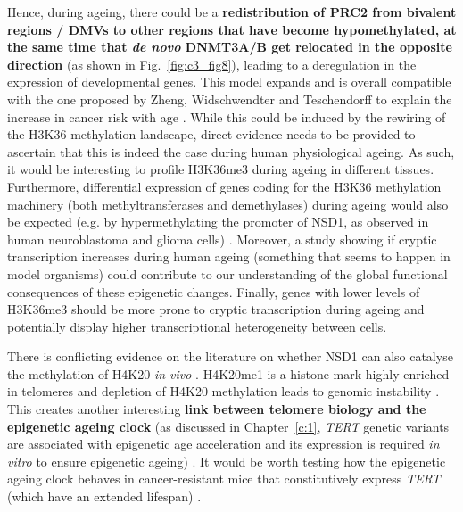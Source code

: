 Hence, during ageing, there could be a  \textbf{redistribution of \acrshort{PRC2} from bivalent regions / \acrshort{DMV}s to other regions that have become hypomethylated, at the same time that \textit{de novo} DNMT3A/B get relocated in the opposite direction} (as shown in Fig.~\ref{fig:c3_fig8}), leading to a deregulation in the expression of developmental genes. This model expands and is overall compatible with the one proposed by Zheng, Widschwendter and Teschendorff to explain the increase in cancer risk with age \cite{Zheng2016}. While this could be induced by the rewiring of the H3K36 methylation landscape, direct evidence needs to be provided to ascertain that this is indeed the case during human physiological ageing. As such, it would be interesting to profile H3K36me3 during ageing in different tissues. Furthermore, differential expression of genes coding for the H3K36 methylation machinery (both methyltransferases and demethylases) during ageing would also be expected (e.g. by hypermethylating the promoter of NSD1, as observed in human neuroblastoma and glioma cells) \cite{Berdasco2009}. Moreover, a study showing if cryptic transcription increases during human ageing (something that seems to happen in model organisms) could contribute to our understanding of the global functional consequences of these epigenetic changes. Finally, genes with lower levels of H3K36me3 should be more prone to cryptic transcription during ageing \cite{Pu2015} and potentially display higher transcriptional heterogeneity between cells. 

\bigskip

There is conflicting evidence on the literature on whether NSD1 can also catalyse the methylation of H4K20 \textit{in vivo} \cite{Berdasco2009,Kudithipudi2014}. H4K20me1 is a histone mark highly enriched in telomeres \cite{Enguix2018} and depletion of H4K20 methylation leads to genomic instability \cite{Sorensen2013}. This creates another interesting \textbf{link between telomere biology and the epigenetic ageing clock} (as discussed in Chapter~\ref{c:1}, \textit{TERT} genetic variants are associated with epigenetic age acceleration and its expression is required \textit{in vitro} to ensure epigenetic ageing) \cite{Lu2018}. It would be worth testing how the epigenetic ageing clock behaves in cancer-resistant mice that constitutively express \textit{TERT} (which have an extended lifespan) \cite{Tomas-Loba2008}. 

\bigskip

